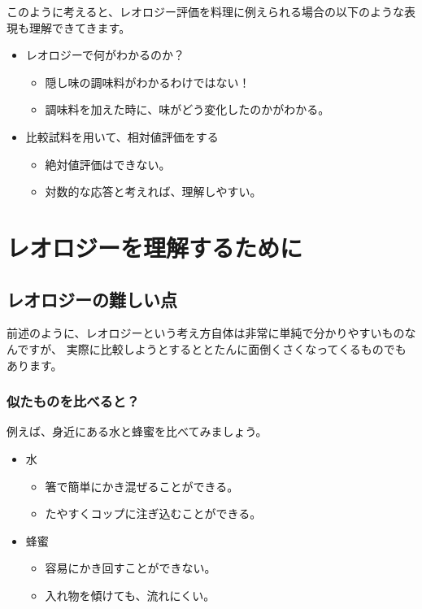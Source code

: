 \documentclass[uplatex,dvipdfmx,a4paper,11pt]{jsreport}
\begin{document}
このように考えると、レオロジー評価を料理に例えられる場合の以下のような表現も理解できてきます。
\begin{itemize}
	\item レオロジーで何がわかるのか？
	\begin{itemize}
		\item 隠し味の調味料がわかるわけではない！
		\item 調味料を加えた時に、味がどう変化したのかがわかる。
	\end{itemize}
	\item 比較試料を用いて、相対値評価をする
	\begin{itemize}
		\item 絶対値評価はできない。
		\item 対数的な応答と考えれば、理解しやすい。
	\end{itemize}
\end{itemize}

\section{レオロジーを理解するために}
\subsection{レオロジーの難しい点}

前述のように、レオロジーという考え方自体は非常に単純で分かりやすいものなんですが、
実際に比較しようとするととたんに面倒くさくなってくるものでもあります。

\subsubsection{似たものを比べると？}

例えば、身近にある水と蜂蜜を比べてみましょう。
\begin{itemize}
	\item 水
	\begin{itemize}
		\item 箸で簡単にかき混ぜることができる。
		\item たやすくコップに注ぎ込むことができる。
	\end{itemize}
	\item 蜂蜜
	\begin{itemize}
		\item 容易にかき回すことができない。
		\item 入れ物を傾けても、流れにくい。
	\end{itemize}
\end{itemize}
\end{document}
